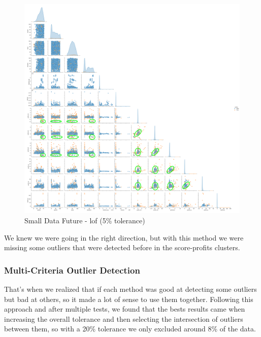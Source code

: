 \documentclass[11pt,english,a4paper,hidelinks]{book}
\begin{document}
\begin{figure}[H]
    \centering
    \includegraphics[width=1\textwidth]{images/code/outliers/Small Data future - LOF.png}
    \caption{Small Data Future - \acrshort{lof} (5\% tolerance)}
    \label{fig:small_data_future_lof}
\end{figure}

\noindent We knew we were going in the right direction, but with this method we were missing some outliers that were detected before in the score-profits clusters.

\newpage
\subsubsection{Multi-Criteria Outlier Detection}

That's when we realized that if each method was good at detecting some outliers but bad at others, so it made a lot of sense to use them together. Following this approach and after multiple tests, we found that the bests results came when increasing the overall tolerance and then selecting the intersection of outliers between them, so with a 20\% tolerance we only excluded around 8\% of the data.
\end{document}
